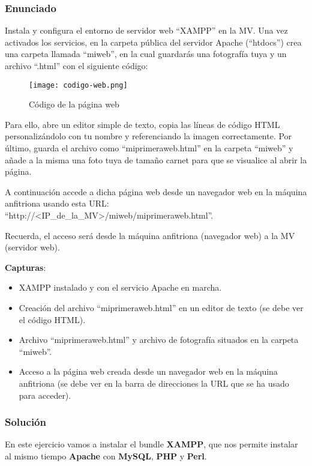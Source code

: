 \subsubsection{Enunciado}
Instala y configura el entorno de servidor web ``XAMPP'' en la MV. Una vez activados los servicios, en la carpeta pública del servidor Apache (``htdocs'') crea una carpeta llamada ``miweb'', en la cual guardarás una fotografía tuya  y un archivo ``.html'' con el siguiente código:

\begin{figure}[H]
    \centering
    \texttt{[image: codigo-web.png]}
    \caption{Código de la página web}
\end{figure}

Para ello, abre un editor simple de texto, copia las líneas de código HTML personalizándolo con tu nombre y referenciando la imagen correctamente. Por último, guarda el archivo como ``miprimeraweb.html'' en la carpeta ``miweb'' y añade a la misma una foto tuya de tamaño carnet para que se visualice al abrir la página.

A continuación accede a dicha página web desde un navegador web en la máquina anfitriona usando esta URL: ``http://<IP\_de\_la\_MV>/miweb/miprimeraweb.html''.

Recuerda, el acceso será desde la máquina anfitriona (navegador web) a la MV (servidor web).

\textbf{Capturas}:

\begin{itemize}
    \item XAMPP instalado y con el servicio Apache en marcha.
    \item Creación del archivo ``miprimeraweb.html'' en un editor de texto (se debe ver el código HTML).
    \item Archivo ``miprimeraweb.html'' y archivo de fotografía situados en la carpeta ``miweb''.
    \item Acceso a la página web creada desde un navegador web en la máquina anfitriona (se debe ver en la barra de direcciones la URL que se ha usado para acceder).
\end{itemize}

\subsubsection{Solución}
En este ejercicio vamos a instalar el bundle \textbf{XAMPP}, que nos permite instalar al mismo tiempo \textbf{Apache} con \textbf{MySQL}, \textbf{PHP} y \textbf{Perl}.

